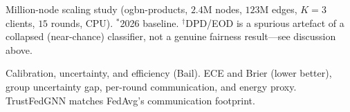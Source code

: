 \begin{table}[t]\centering\small
\caption{Million-node scaling study (ogbn-products, $2.4$M nodes, $123$M
edges, $K{=}3$ clients, $15$ rounds, CPU). $^{\ast}$2026 baseline.
$^{\dagger}$DPD/EOD is a spurious artefact of a collapsed (near-chance)
classifier, not a genuine fairness result---see discussion above.}
\label{tab:large-scale}

\end{table}

\begin{table}[t]\centering\small
\caption{Calibration, uncertainty, and efficiency (Bail). ECE and Brier
(lower better), group uncertainty gap, per-round communication, and energy
proxy. TrustFedGNN matches FedAvg's communication footprint.}
\label{tab:efficiency}

\end{table}
